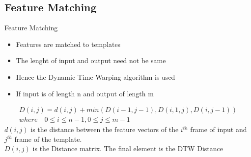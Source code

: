 \documentclass{beamer}
\begin{document}
\subsection{Feature Matching}

\begin{frame}{Feature Matching}
\begin{itemize}
	\item Features are matched to templates
	\item The lenght of input and output need not be same
	\item Hence the Dynamic Time Warping algorithm is used
	\item If input is of length n and output of length m
\end{itemize}
\begin{align}
	D(i,j) = d(i,j) + min(D(i-1,j-1),D(i,1,j),D(i,j-1)) \\
	where \quad 0\leq i \leq n-1, 0\leq j \leq m-1 \nonumber
\end{align}
$d(i,j)$ is the distance between the feature vectors of the $i^{th}$ frame of input and $j^{th}$ frame of the template. \\
$D(i,j)$ is the Distance matrix. The final element is the DTW Distance
\end{frame}
\end{document}
